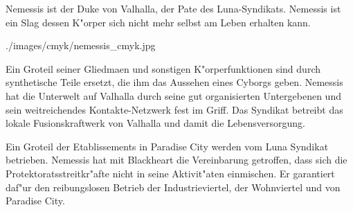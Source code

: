 
Nemessis ist der Duke von Valhalla, der Pate des Luna-Syndikats. Nemessis ist ein Slag dessen K"orper sich nicht mehr selbst am Leben erhalten kann. 

\begin{sideimagebox}[r]{0.9}{./images/cmyk/nemessis_cmyk.jpg}{}

\end{sideimagebox}

Ein Gro\3teil seiner Gliedma\3en und sonstigen K"orperfunktionen sind durch synthetische Teile ersetzt, die ihm das Aussehen eines Cyborgs geben. Nemessis hat die Unterwelt auf Valhalla durch seine gut organisierten Untergebenen und sein weitreichendes Kontakte-Netzwerk
fest im Griff. Das Syndikat betreibt das lokale Fusionskraftwerk von Valhalla und damit die Lebensversorgung.

Ein Gro\3teil der Etablissements in Paradise City werden vom Luna Syndikat betrieben. Nemessis hat mit Blackheart die Vereinbarung getroffen, dass sich die Protektoratsstreitkr"afte nicht in seine Aktivit"aten einmischen. Er garantiert daf"ur den reibungslosen Betrieb 
der Industrieviertel, der Wohnviertel und von Paradise City.

